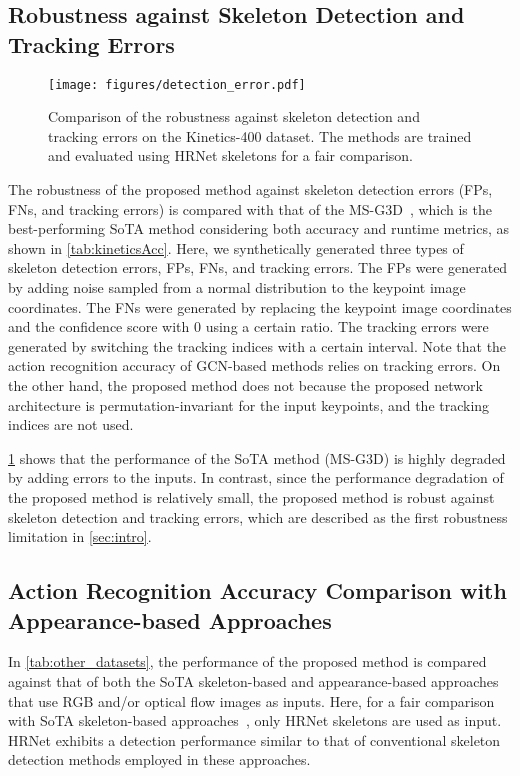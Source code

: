 \documentclass[10pt,twocolumn,letterpaper]{article}
\begin{document}
\subsection{Robustness against Skeleton Detection and Tracking Errors}
\begin{figure}[tb]
  \centering
  \texttt{[image: figures/detection\_error.pdf]}
  \caption{Comparison of the robustness against skeleton detection and tracking errors on the Kinetics-400 dataset. The methods are trained and evaluated using HRNet skeletons for a fair comparison.}
  \label{fig:detection_error}
\end{figure}

The robustness of the proposed method against skeleton detection errors (FPs, FNs, and tracking errors) is compared with that of the MS-G3D~\cite{Liu2020CVPR}, which is the best-performing SoTA method considering both accuracy and runtime metrics, as shown in \cref{tab:kineticsAcc}.
Here, we synthetically generated three types of skeleton detection errors, FPs, FNs, and tracking errors.
The FPs were generated by adding noise sampled from a normal distribution to the keypoint image coordinates.
The FNs were generated by replacing the keypoint image coordinates and the confidence score with $0$ using a certain ratio.
The tracking errors were generated by switching the tracking indices with a certain interval.
Note that the action recognition accuracy of GCN-based methods relies on tracking errors.
On the other hand, the proposed method does not because the proposed network architecture is permutation-invariant for the input keypoints, and the tracking indices are not used.

\cref{fig:detection_error} shows that the performance of the SoTA method (MS-G3D) is highly degraded by adding errors to the inputs.
In contrast, since the performance degradation of the proposed method is relatively small, the proposed method is robust against skeleton detection and tracking errors, which are described as the first robustness limitation in \cref{sec:intro}.

\subsection{Action Recognition Accuracy Comparison with Appearance-based Approaches}

In \cref{tab:other_datasets}, the performance of the proposed method is compared against that of both the SoTA skeleton-based and appearance-based approaches that use RGB and/or optical flow images as inputs.
Here, for a fair comparison with SoTA skeleton-based approaches~\cite{Su2020ECCV,Moon2021CVPR,Duan2022CVPR}, only HRNet skeletons are used as input.
HRNet exhibits a detection performance similar to that of conventional skeleton detection methods employed in these approaches.
\end{document}
